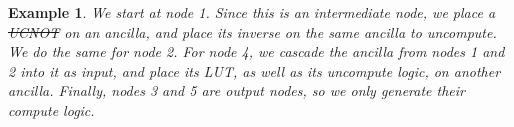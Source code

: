 \documentclass[paper]{ieice}
\newtheorem{example}{Example}
\providecommand{\DIFadd}[1]{{\protect\color{blue}{#1}}} %
\providecommand{\DIFdel}[1]{{\protect\color{red}\sout{#1}}}                      %
\providecommand{\DIFaddbegin}{} %
\providecommand{\DIFaddend}{} %
\providecommand{\DIFdelbegin}{} %
\providecommand{\DIFdelend}{} %
\newcommand{\DIFscaledelfig}{0.5}
\newlength{\DIFdelgraphicswidth} %
\newlength{\DIFdelgraphicsheight} %
\newcommand{\DIFaddincludegraphics}[2][]{{\color{blue}\fbox{\DIFOincludegraphics[#1]{#2}}}} %
\newcommand{\DIFdelincludegraphics}[2][]{%
\sbox{\DIFdelgraphicsbox}{\DIFOincludegraphics[#1]{#2}}%
\settoboxwidth{\DIFdelgraphicswidth}{\DIFdelgraphicsbox} %
\settoboxtotalheight{\DIFdelgraphicsheight}{\DIFdelgraphicsbox} %
\scalebox{\DIFscaledelfig}{%
\parbox[b]{\DIFdelgraphicswidth}{\usebox{\DIFdelgraphicsbox}\\[-\baselineskip] \rule{\DIFdelgraphicswidth}{0em}}\llap{\resizebox{\DIFdelgraphicswidth}{\DIFdelgraphicsheight}{%
\setlength{\unitlength}{\DIFdelgraphicswidth}%
\begin{picture}(1,1)%
\thicklines\linethickness{2pt} %
{\color[rgb]{1,0,0}\put(0,0){\framebox(1,1){}}}%
{\color[rgb]{1,0,0}\put(0,0){\line( 1,1){1}}}%
{\color[rgb]{1,0,0}\put(0,1){\line(1,-1){1}}}%
\end{picture}%
}\hspace*{3pt}}} %
} %
\DeclareRobustCommand{\DIFaddbegin}{\DIFOaddbegin \let\includegraphics\DIFaddincludegraphics} %
\DeclareRobustCommand{\DIFaddend}{\DIFOaddend \let\includegraphics\DIFOincludegraphics} %
\DeclareRobustCommand{\DIFdelbegin}{\DIFOdelbegin \let\includegraphics\DIFdelincludegraphics} %
\DeclareRobustCommand{\DIFdelend}{\DIFOaddend \let\includegraphics\DIFOincludegraphics} %
\begin{document}
{\begin{example}
  \label{ex-lut}
  We start at node 1. Since this is an intermediate node, we place a \DIFdelbegin \DIFdel{UCNOT }\DIFdelend \DIFaddbegin \DIFadd{FCNOT }\DIFaddend on an ancilla, and place its inverse on the same ancilla to uncompute. We do the same for node 2. For node 4, we cascade the ancilla from nodes 1 and 2 into it as input, and place its LUT, as well as its uncompute logic, on another ancilla. Finally, nodes 3 and 5 are output nodes, so we only generate their compute logic. 

\end{example}









}
\end{document}
